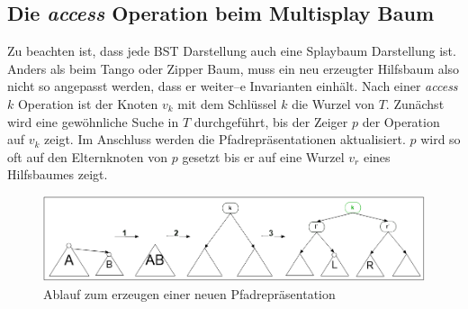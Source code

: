 \documentclass[a4paper,12pt]{article}
\begin{document}
 \subsection{Die \textit{access} Operation beim Multisplay Baum}
 Zu beachten ist, dass jede BST Darstellung auch eine Splaybaum Darstellung ist. Anders als beim Tango oder Zipper Baum, muss ein neu erzeugter Hilfsbaum also nicht so angepasst werden, dass er weiter--e Invarianten einhält.  Nach einer \textit{access}$k$ Operation ist der Knoten $v_k$ mit dem Schlüssel $k$ die Wurzel von $T$. Zunächst wird eine gewöhnliche Suche in $T$ durchgeführt, bis der Zeiger $p$ der Operation auf $v_k$ zeigt. Im Anschluss werden die Pfadrepräsentationen aktualisiert. $p$ wird so oft auf den Elternknoten von $p$ gesetzt bis er auf eine Wurzel $v_r$ eines Hilfsbaumes zeigt.  \\
 

\begin{figure}[h]
	\centering
	\includegraphics[width= 1\textwidth]{"Medien/Multisplay/split"}
	\caption {Ablauf zum erzeugen einer neuen Pfadrepräsentation}
	\label{fig:split}
\end{figure} 



\newpage


\end{document}
